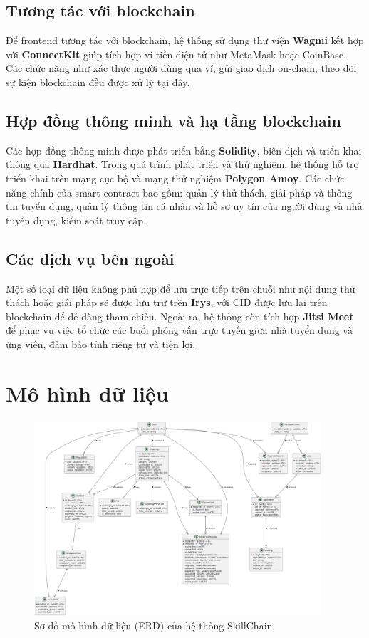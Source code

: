 \subsection{Tương tác với blockchain}

Để frontend tương tác với blockchain, hệ thống sử dụng thư viện \textbf{Wagmi} kết hợp với \textbf{ConnectKit} giúp tích hợp ví tiền điện tử như MetaMask hoặc CoinBase.
Các chức năng như xác thực người dùng qua ví, gửi giao dịch on-chain, theo dõi sự kiện blockchain đều được xử lý tại đây.

\subsection{Hợp đồng thông minh và hạ tầng blockchain}

Các hợp đồng thông minh được phát triển bằng \textbf{Solidity}, biên dịch và triển khai thông qua \textbf{Hardhat}. Trong quá trình phát triển và thử nghiệm, hệ thống hỗ trợ triển khai trên mạng cục bộ và mạng thử nghiệm \textbf{Polygon Amoy}.
Các chức năng chính của smart contract bao gồm: quản lý thử thách, giải pháp và thông tin tuyển dụng, quản lý thông tin cá nhân và hồ sơ uy tín của người dùng và nhà tuyển dụng, kiểm soát truy cập.

\subsection{Các dịch vụ bên ngoài}

Một số loại dữ liệu không phù hợp để lưu trực tiếp trên chuỗi như nội dung thử thách hoặc giải pháp sẽ được lưu trữ trên \textbf{Irys}, với CID được lưu lại trên blockchain để dễ dàng tham chiếu.
Ngoài ra, hệ thống còn tích hợp \textbf{Jitsi Meet} để phục vụ việc tổ chức các buổi phỏng vấn trực tuyến giữa nhà tuyển dụng và ứng viên, đảm bảo tính riêng tư và tiện lợi.

\section{Mô hình dữ liệu}

\begin{figure}[H]
  \centering
  \includegraphics[width=0.95\textwidth]{../images/ERD.png}
  \caption{Sơ đồ mô hình dữ liệu (ERD) của hệ thống SkillChain}
  \label{fig:erd}
\end{figure}

